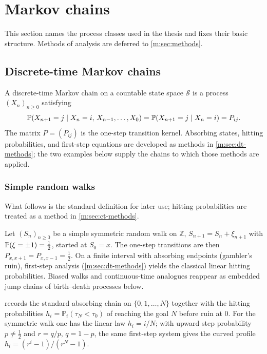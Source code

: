 \section{Markov chains}
\label{m:sec:markov}

This section names the process classes used in the thesis and fixes their basic
structure. Methods of analysis are deferred to \cref{m:sec:methods}.

\subsection{Discrete-time Markov chains}
\label{m:sec:dtmc}

A discrete-time Markov chain on a countable state space \(\mathcal S\) is a process
\((X_n)_{n\ge0}\) satisfying
\begin{equation*}
\mathbb{P}\!\left(X_{n+1}=j\mid X_n=i,\,X_{n-1},\dots,X_0\right)
= \mathbb{P}\!\left(X_{n+1}=j\mid X_n=i\right)
= P_{ij}.
\end{equation*}
The matrix \(P=(P_{ij})\) is the one-step transition kernel. Absorbing states,
hitting probabilities, and first-step equations are developed as methods in
\cref{m:sec:dt-methods}; the two examples below supply the chains to which those
methods are applied.

\subsubsection{Simple random walks}
\label{m:sec:rw}

\begin{remark}[Scope]
\label{m:rem:rw-todo}
What follows is the standard definition for later use; hitting probabilities are
treated as a method in \cref{m:sec:ct-methods}.
\end{remark}

Let \((S_n)_{n\ge0}\) be a simple symmetric random walk on \(\mathbb{Z}\),
\(S_{n+1}=S_n+\xi_{n+1}\) with \(\mathbb{P}\!\left(\xi=\pm1\right)=\tfrac12\), started at \(S_0=x\).
The one-step transitions are then \(P_{x,x+1}=P_{x,x-1}=\tfrac12\). On a finite
interval with absorbing endpoints (gambler's ruin), first-step analysis
(\cref{m:sec:dt-methods}) yields the classical linear hitting probabilities. Biased
walks and continuous-time analogues reappear as embedded jump chains of birth--death
processes below.

 records the standard absorbing chain on \(\{0,1,\dots,N\}\)
together with the hitting probabilities \(h_i=\mathbb{P}_i(\tau_N<\tau_0)\) of
reaching the goal \(N\) before ruin at \(0\). For the symmetric walk one has the
linear law \(h_i=i/N\); with upward step probability \(p\neq\tfrac12\) and
\(r=q/p\), \(q=1-p\), the same first-step system gives the curved profile
\(h_i=(r^i-1)/(r^N-1)\).

